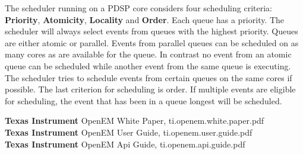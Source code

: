 The scheduler running on a PDSP core considers four scheduling criteria: \textbf{Priority}, \textbf{Atomicity}, \textbf{Locality} and \textbf{Order}. Each queue has a priority. The scheduler will always select events from queues with the highest priority. Queues are either atomic or parallel. Events from parallel queues can be scheduled on as many cores as are available for the queue. In contrast no event from an atomic queue can be scheduled while another event from the same queue is executing. The scheduler tries to schedule events from certain queues on the same cores if possible. The last criterion for scheduling is order. If multiple events are eligible for scheduling, the event that has been in a queue longest will be scheduled.

\textbf{Texas Instrument} OpenEM White Paper, ti.openem.white.paper.pdf\\
\textbf{Texas Instrument} OpenEM User Guide, ti.openem.user.guide.pdf\\
\textbf{Texas Instrument} OpenEM Api Guide, ti.openem.api.guide.pdf\\
